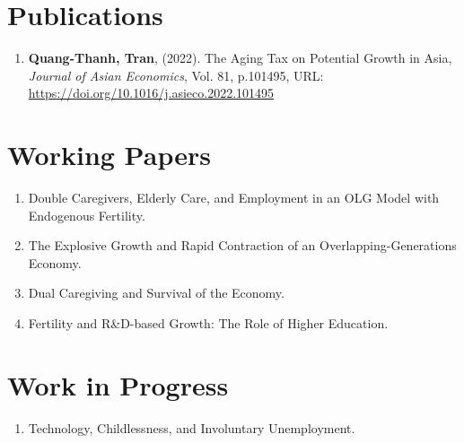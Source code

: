 \section{\sc Publications}
\begin{enumerate}
\item
  {\bf Quang-Thanh, Tran},
  (2022).
  {The Aging Tax on Potential Growth in Asia},
  {\it Journal of Asian Economics}, Vol. 81, p.101495,
  {URL: \url{https://doi.org/10.1016/j.asieco.2022.101495}}
\end{enumerate}

\section{\sc Working Papers}
\begin{enumerate}
  \item Double Caregivers, Elderly Care, and Employment in an OLG Model with Endogenous Fertility. 
  \item The Explosive Growth and Rapid Contraction of an Overlapping-Generations Economy. 
  \item Dual Caregiving and Survival of the Economy.
  \item Fertility and R&D-based Growth: The Role of Higher Education.
\end{enumerate}

\section{\sc Work in Progress}
\begin{enumerate}
  \item Technology, Childlessness, and Involuntary Unemployment.
\end{enumerate}


